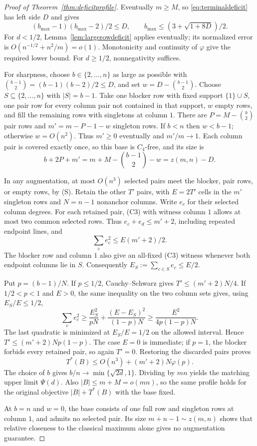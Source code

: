 \documentclass[11pt]{article}
\begin{document}
\begin{proof}[Proof of Theorem~\ref{thm:deficitprofile}]
Eventually $m\ge M$, so \eqref{eq:terminaldeficit} has left side $D$ and gives
\[
 (b_{\max}-1)(b_{\max}-2)/2\le D,
 \qquad b_{\max}\le(3+\sqrt{1+8D})/2.
\]
For $d<1/2$, Lemma~\ref{lem:largerowdeficit} applies eventually;
its normalized error is $O(n^{-1/2}+n^2/m)=o(1)$.
Monotonicity and continuity of $\varphi$ give the required lower bound.
For $d\ge1/2$, nonnegativity suffices.

For sharpness, choose $b\in\{2,\ldots,n\}$ as large as possible with
$\binom{b-1}2=(b-1)(b-2)/2\le D$, and set $w=D-\binom{b-1}2$.
Choose $S\subseteq\{2,\ldots,n\}$ with $|S|=b-1$.
Take one blocker row with fixed support $\{1\}\cup S$,
one pair row for every column pair not contained in that support,
$w$ empty rows, and fill the remaining rows with singletons at column $1$.
There are $P=M-\binom b2$ pair rows and
$m'=m-P-1-w$ singleton rows. If $b<n$ then $w<b-1$; otherwise
$w=O(n^2)$. Thus $m'\ge0$ eventually and $m'/m\to1$.
Each column pair is covered exactly once, so this base is $C_4$-free,
and its size is
\[
 b+2P+m'=m+M-\binom{b-1}2-w=z(m,n)-D.
\]

In any augmentation, at most $O(n^3)$ selected pairs meet the blocker,
pair rows, or empty rows, by (S). Retain the other $T'$ pairs, with
$E=2T'$ cells in the $m'$ singleton rows and $N=n-1$ nonanchor columns.
Write $e_c$ for their selected column degrees. For each retained pair,
(C3) with witness column $1$ allows at most two common selected rows.
Thus $e_c+e_d\le m'+2$, including repeated endpoint lines, and
\[
 \sum_c e_c^2\le E(m'+2)/2.
\]
The blocker row and column $1$ also give an all-fixed (C3) witness
whenever both endpoint columns lie in $S$. Consequently
$E_S:=\sum_{c\in S}e_c\le E/2$.

Put $p=(b-1)/N$. If $p\le1/2$, Cauchy--Schwarz gives
$T'\le(m'+2)N/4$. If $1/2<p<1$ and $E>0$, the same inequality on the two
column sets gives, using $E_S/E\le1/2$,
\[
 \sum_c e_c^2\ge\frac{E_S^2}{pN}
                    +\frac{(E-E_S)^2}{(1-p)N}
             \ge\frac{E^2}{4p(1-p)N}.
\]
The last quadratic is minimized at $E_S/E=1/2$ on the allowed interval.
Hence $T'\le(m'+2)Np(1-p)$. The case $E=0$ is immediate; if $p=1$,
the blocker forbids every retained pair, so again $T'=0$.
Restoring the discarded pairs proves
\[
 T^*(B)\le O(n^3)+(m'+2)N\varphi(p).
\]
The choice of $b$ gives $b/n\to\min\{\sqrt{2d},1\}$.
Dividing by $mn$ yields the matching upper limit $\Psi(d)$.
Also $|B|\le m+M=o(mn)$, so the same profile holds for the original
objective $|B|+T^*(B)$ with the base fixed.

At $b=n$ and $w=0$, the base consists of one full row and singleton rows
at column $1$, and admits no selected pair. Its size
$m+n-1\sim z(m,n)$ shows that relative closeness to the classical
maximum alone gives no augmentation guarantee.
\end{proof}
\end{document}

